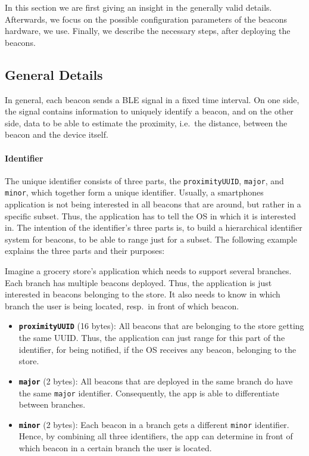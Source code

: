 In this section we are first giving an insight in the generally valid details. Afterwards, we focus on the possible configuration parameters of the beacons hardware, we use. Finally, we describe the necessary steps, after deploying the beacons.

\subsection{General Details}
In general, each beacon sends a \acs{BLE} signal in a fixed time interval. On one side, the signal contains information to uniquely identify a beacon, and on the other side, data to be able to estimate the proximity, i.e.\ the distance, between the beacon and the device itself.

\paragraph{Identifier} The unique identifier consists of three parts, the \texttt{proximityUUID}, \texttt{major}, and \texttt{minor}, which together form a unique identifier. Usually, a smartphones application is not being interested in all beacons that are around, but rather in a specific subset. Thus, the application has to tell the \ac{OS} in which it is interested in. The intention of the identifier's three parts is, to build a hierarchical identifier system for beacons, to be able to range just for a subset. The following example explains the three parts and their purposes:

Imagine a grocery store's application which needs to support several branches. Each branch has multiple beacons deployed. Thus, the application is just interested in beacons belonging to the store. It also needs to know in which branch the user is being located, resp.\ in front of which beacon.

\begin{itemize}
  \item \textbf{\texttt{proximityUUID}} (16 bytes): All beacons that are belonging to the store getting the same \acl{UUID}. Thus, the application can just range for this part of the identifier, for being notified, if the \ac{OS} receives any beacon, belonging to the store.
  \item \textbf{\texttt{major}} (2 bytes): All beacons that are deployed in the same branch do have the same \texttt{major} identifier. Consequently, the app is able to differentiate between branches.
  \item \textbf{\texttt{minor}} (2 bytes): Each beacon in a branch gets a different \texttt{minor} identifier. Hence, by combining all three identifiers, the app can determine in front of which beacon in a certain branch the user is located.
\end{itemize}

